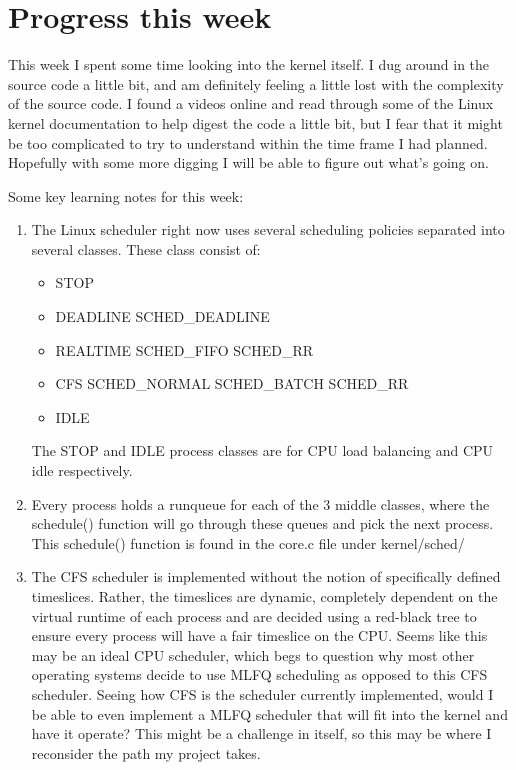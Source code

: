 \documentclass[12pt]{article}
\def\ind{\hspace*{0.3in}}
\begin{document}
\setlength{\parindent}{0in}
\addtolength{\parskip}{0.1cm}
\setlength{\fboxrule}{.5mm}\setlength{\fboxsep}{1.2mm}
\newlength{\boxlength}\setlength{\boxlength}{\textwidth}
\addtolength{\boxlength}{-4mm}
\begin{center}
\end{center}
\vspace{2mm}

\section*{Progress this week}
\ind This week I spent some time looking into the kernel itself. I dug around in the source code a little bit, and am definitely feeling a little lost with the complexity of the source code. I found a videos online and read through some of the Linux kernel documentation to help digest the code a little bit, but I fear that it might be too complicated to try to understand within the time frame I had planned. Hopefully with some more digging I will be able to figure out what's going on.

Some key learning notes for this week:
\begin{enumerate}
    \item The Linux scheduler right now uses several scheduling policies separated into several classes. These class consist of:
    \begin{itemize}
        \item STOP
        \item DEADLINE
        \subitem SCHED\_DEADLINE
        \item REALTIME
        \subitem SCHED\_FIFO
        \subitem SCHED\_RR
        \item CFS
        \subitem SCHED\_NORMAL
        \subitem SCHED\_BATCH
        \subitem SCHED\_RR
        \item IDLE
    \end{itemize}
    The STOP and IDLE process classes are for CPU load balancing and CPU idle respectively.
    \item Every process holds a runqueue for each of the 3 middle classes, where the schedule() function will go through these queues and pick the next process. This schedule() function is found in the core.c file under kernel/sched/
    \item The CFS scheduler is implemented without the notion of specifically defined timeslices. Rather, the timeslices are dynamic, completely dependent on the virtual runtime of each process and are decided using a red-black tree to ensure every process will have a fair timeslice on the CPU. Seems like this may be an ideal CPU scheduler, which begs to question why most other operating systems decide to use MLFQ scheduling as opposed to this CFS scheduler. Seeing how CFS is the scheduler currently implemented, would I be able to even implement a MLFQ scheduler that will fit into the kernel and have it operate? This might be a challenge in itself, so this may be where I reconsider the path my project takes.
\end{enumerate}
\end{document}
